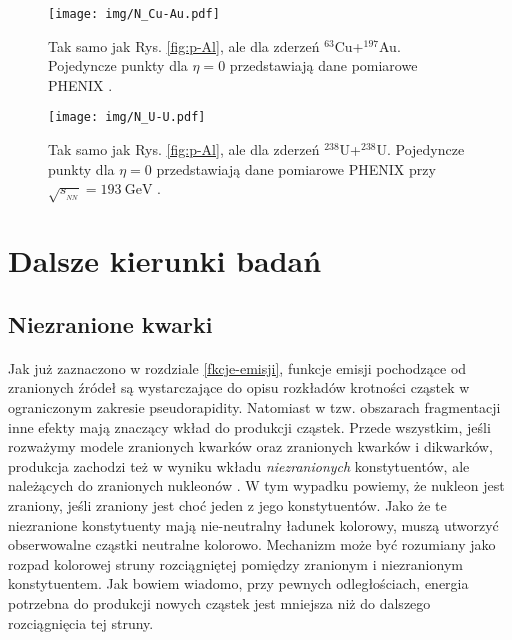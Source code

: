 \documentclass[a4paper,12pt]{article}
\begin{document}
\begin{figure}[H]
\begin{center}
\texttt{[image: img/N\_Cu-Au.pdf]}
\caption{Tak samo jak Rys. \ref{fig:p-Al}, ale dla zderzeń $^{63}$Cu+$^{197}$Au. Pojedyncze punkty dla $\eta=0$ przedstawiają dane pomiarowe PHENIX \cite{Adare:2015bua}.}\label{fig:Cu-Au}
\end{center}
\end{figure}
\begin{figure}[H]
\begin{center}
\texttt{[image: img/N\_U-U.pdf]}
\caption{Tak samo jak Rys. \ref{fig:p-Al}, ale dla zderzeń $^{238}$U+$^{238}$U. Pojedyncze punkty dla $\eta=0$ przedstawiają dane pomiarowe PHENIX przy $\sqrt{s_{_{NN}}} = 193~\text{GeV}$ \cite{Adare:2015bua}.}\label{fig:U-U}
\end{center}
\end{figure}

\newpage
\section{Dalsze kierunki badań}
\subsection{Niezranione kwarki} \label{unwounded}
\paragraph{}
Jak już zaznaczono w rozdziale \ref{fkcje-emisji}, funkcje emisji pochodzące od zranionych źródeł są wystarczające do opisu rozkładów krotności cząstek w ograniczonym zakresie pseudorapidity. Natomiast w tzw. obszarach fragmentacji inne efekty mają znaczący wkład do produkcji cząstek. Przede wszystkim, jeśli rozważymy modele zranionych kwarków oraz zranionych kwarków \quad \quad \quad i dikwarków, produkcja zachodzi też w wyniku wkładu \textit{niezranionych} konstytuentów, ale należących do zranionych nukleonów \cite{Bialas:2007eg}. W tym wypadku powiemy, że nukleon jest zraniony, jeśli zraniony jest choć jeden z jego konstytuentów. Jako że te niezranione konstytuenty mają nie-neutralny ładunek kolorowy, muszą utworzyć obserwowalne cząstki neutralne kolorowo. Mechanizm może być rozumiany jako rozpad kolorowej struny rozciągniętej pomiędzy zranionym i niezranionym konstytuentem. Jak bowiem wiadomo, przy pewnych odległościach, energia potrzebna do produkcji nowych cząstek jest mniejsza niż do dalszego rozciągnięcia tej struny.
\end{document}
